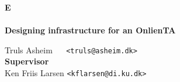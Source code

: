 \documentclass[a4paper,11pt]{memoir}
\theoremstyle{definition}
\begin{document}
\begin{titlingpage}
\thispagestyle{empty}
\begin{adjustwidth}{-1.75cm}{-1.5cm}
\vspace*{-1cm}
\textbf{\huge E} \\
\vspace*{2.5cm} \\
\textbf{\Huge Designing infrastructure for an OnlienTA} \\
\begin{tabbing}
  Truls Asheim ~~ \= \texttt{<truls@asheim.dk>} \\[14.3cm]
  \textbf{\Large Supervisor} \\
  Ken Friis Larsen \> \texttt{<kflarsen@di.ku.dk>}
\end{tabbing}
\end{adjustwidth}
    \ClearWallPaper

\end{titlingpage}


\begin{abstract}
\end{abstract}

\begin{otherlanguage}{danish}
\begin{abstract}
\end{abstract}
\end{otherlanguage}
\clearpage




\printbibliography

\appendix


\end{document}
